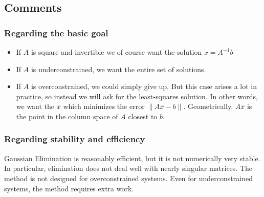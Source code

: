 \begin{enumerate}[label=(\roman*)]
    \subsection*{Comments}
    
    \subsubsection*{Regarding the basic goal}
    \begin{itemize}
        \item If $A$ is square and invertible we of course want the solution $x = A^{-1}b$
        \item If $A$ is underconstrained, we want the entire set of solutions. 
        \item If $A$ is overconstrained, we could simply give up. But this case arises a lot in practice, so instead we will ask for the least-squares solution. In other words, we want the $\bar{x}$ which minimizes the error $\| A\bar{x} - b \|$. Geometrically, $A\bar{x}$ is the point in the column space of $A$ closest to $b$.
    \end{itemize}
    
    \subsubsection*{Regarding stability and efficiency}

    Gaussian Elimination is reasonably efficient, but it is not numerically very stable. In particular, elimination does not deal well with nearly singular matrices. The method is not designed for overconstrained systems. Even for underconstrained systems, the method requires extra work. 
    

\end{enumerate}

